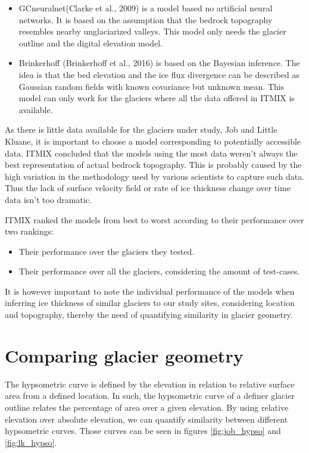 \documentclass[a4, 12pt]{article}
\begin{document}
\begin{itemize}
		\begin{itemize}
			\item GCneuralnet(Clarke et al., 2009) is a model based no artificial neural networks. It is based on the assumption that the bedrock topography resembles nearby unglaciarized valleys. This model only needs the glacier outline and the digital elevation model.
			\item Brinkerhoff (Brinkerhoff et al., 2016) is based on the Bayesian inference. The idea is that the bed elevation and the ice flux divergence can be described as Gaussian random fields with known covariance but unknown mean. This model can only work for the glaciers where all the data offered in ITMIX is available.
		\end{itemize}		
\end{itemize}
As there is little data available for the glaciers under study, Job and Little Kluane, it is important to choose a model corresponding to potentially accessible data. ITMIX concluded that the models using the most data weren't always the best representation of actual bedrock topography. This is probably caused by the high variation in the methodology used by various scientists to capture such data. Thus the lack of surface velocity field or rate of ice thickness change over time data isn't too dramatic.

ITMIX ranked the models from best to worst according to their performance over two rankings:
\begin{itemize}
	\item Their performance over the glaciers they tested.
	\item Their performance over all the glaciers, considering the amount of test-cases. 
\end{itemize}
It is however important to note the individual performance of the models when inferring ice thickness of similar glaciers to our study sites, considering location and topography, thereby the need of quantifying similarity in glacier geometry.

\section{Comparing glacier geometry}
The hypsometric curve is defined by the elevation in relation to relative surface area from a defined location. In such, the hypsometric curve of a definer glacier outline relates the percentage of area over a given elevation. By using relative elevation over absolute elevation, we can quantify similarity between different hypsometric curves.
Those curves can be seen in figures \ref{fig:job_hypso} and \ref{fig:lk_hypso}.
\end{document}
